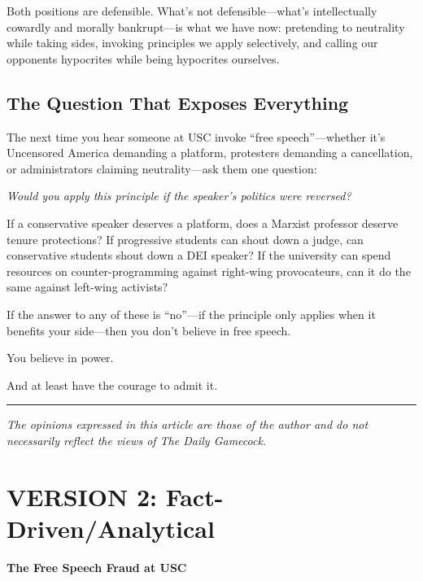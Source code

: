\documentclass[11pt]{article}
\begin{document}
Both positions are defensible. What's not defensible---what's intellectually cowardly and morally bankrupt---is what we have now: pretending to neutrality while taking sides, invoking principles we apply selectively, and calling our opponents hypocrites while being hypocrites ourselves.

\subsection{The Question That Exposes Everything}

The next time you hear someone at USC invoke ``free speech''---whether it's Uncensored America demanding a platform, protesters demanding a cancellation, or administrators claiming neutrality---ask them one question:

\textit{Would you apply this principle if the speaker's politics were reversed?}

If a conservative speaker deserves a platform, does a Marxist professor deserve tenure protections? If progressive students can shout down a judge, can conservative students shout down a DEI speaker? If the university can spend resources on counter-programming against right-wing provocateurs, can it do the same against left-wing activists?

If the answer to any of these is ``no''---if the principle only applies when it benefits your side---then you don't believe in free speech.

You believe in power.

And at least have the courage to admit it.

\vspace{0.5cm}
\hrule
\vspace{0.3cm}
{\small\textit{The opinions expressed in this article are those of the author and do not necessarily reflect the views of The Daily Gamecock.}}

\newpage


\section{VERSION 2: Fact-Driven/Analytical}
\vspace{1cm}

{\LARGE\bfseries The Free Speech Fraud at USC}
\end{document}
